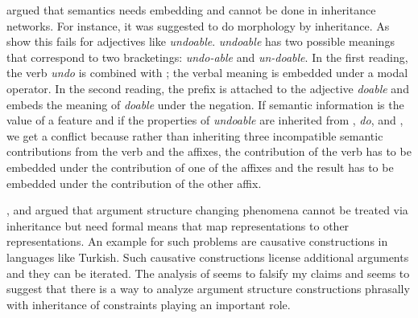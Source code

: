\citet{MuellerPersian} argued that semantics needs embedding and cannot be done in inheritance
networks. For instance, it was suggested to do morphology by inheritance. As \citet{KN93a} show this
fails for adjectives like \emph{undoable}. \emph{undoable} has two possible meanings that correspond
to two bracketings: \emph{undo-able} and \emph{un-doable}. In the first reading, the verb \emph{undo}
is combined with ; the verbal meaning is embedded under a modal operator. In the second
reading, the prefix  is attached to the adjective \emph{doable} and embeds the meaning
of \emph{doable} under the negation. If semantic information is the value of a feature and if
the properties of \emph{undoable} are inherited from , \emph{do}, and , we
get a conflict because rather than inheriting three incompatible semantic contributions from the
verb and the affixes, the contribution of the verb has to be embedded under the contribution of one
of the affixes and the result has to be embedded under the contribution of the other affix.  

\citet{MuellerLehrbuch1}, \citet{MuellerUnifying} and \citet{MWArgSt} argued that argument structure changing
phenomena cannot be treated via inheritance but need formal means that map representations to other
representations. An example for such problems are causative constructions in languages like Turkish.
Such causative constructions license additional arguments and they can be iterated. The analysis of
\citet{AGT2014a} seems to falsify my claims and seems to suggest that there is a way to analyze
argument structure constructions phrasally with inheritance of constraints playing an important role.

